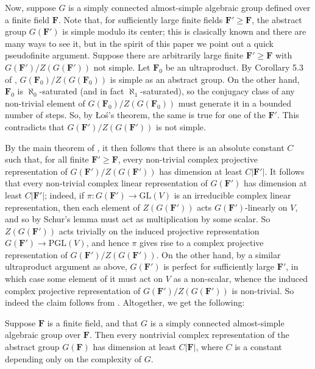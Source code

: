 \documentclass[10pt]{article}
\begin{document}
{Now, suppose $G$ is a simply connected almost-simple algebraic group defined over a finite field $\mathbf{F}$. Note that, for sufficiently large finite fields $\mathbf{F}'\geqslant\mathbf{F}$, the abstract group $G(\mathbf{F}')$ is simple modulo its center; this is clasically known and there are many ways to see it, but in the spirit of this paper we point out a quick pseudofinite argument. Suppose there are arbitrarily large finite $\mathbf{F}'\geqslant\mathbf{F}$ with $G(\mathbf{F}')/Z(G(\mathbf{F}'))$ not simple. Let $\mathbf{F}_0$ be an ultraproduct. By Corollary 5.3 of \cite{hrushovski_pillay_2}, $G(\mathbf{F}_0)/Z(G(\mathbf{F}_0))$ is simple as an abstract group. On the other hand, $\mathbf{F}_0$ is $\aleph_0$-saturated (and in fact $\aleph_1$-saturated), so the conjugacy class of any non-trivial element of $G(\mathbf{F}_0)/Z(G(\mathbf{F}_0))$ must generate it in a bounded number of steps. So, by Łoś's theorem, the same is true for one of the $\mathbf{F}'$. This contradicts that $G(\mathbf{F}')/Z(G(\mathbf{F}'))$ is not simple.

By the main theorem of \cite{landazuri_seitz}, it then follows that there is an absolute constant $C$ such that, for all finite $\mathbf{F}'\geqslant\mathbf{F}$, every non-trivial complex projective representation of $G(\mathbf{F}')/Z(G(\mathbf{F}'))$ has dimension at least $C|\mathbf{F}'|$. It follows that every non-trivial complex linear representation of $G(\mathbf{F}')$ has dimension at least $C|\mathbf{F}'|$; indeed, if $\pi:G(\mathbf{F}')\to\mathrm{GL}(V)$ is an irreducible complex linear representation, then each element of $Z(G(\mathbf{F}'))$ acts $G(\mathbf{F}')$-linearly on $V$, and so by Schur's lemma must act as multiplication by some scalar. So $Z(G(\mathbf{F}'))$ acts trivially on the induced projective representation $G(\mathbf{F}')\to\mathrm{PGL}(V)$, and hence $\pi$ gives rise to a complex projective representation of $G(\mathbf{F}')/Z(G(\mathbf{F}'))$. On the other hand, by a similar ultraproduct argument as above, $G(\mathbf{F}')$ is perfect for sufficiently large $\mathbf{F}'$, in which case some element of it must act on $V$ as a non-scalar, whence the induced complex projective representation of $G(\mathbf{F}')/Z(G(\mathbf{F}'))$ is non-trivial. So indeed the claim follows from \cite{landazuri_seitz}. Altogether, we get the following:


\begin{fact}\label{cfsg}
    Suppose $\mathbf{F}$ is a finite field, and that $G$ is a simply connected almost-simple algebraic group over $\mathbf{F}$. Then every nontrivial complex representation of the abstract group $G(\mathbf{F})$ has dimension at least $C|\mathbf{F}|$, where $C$ is a constant depending only on the complexity of $G$.
\end{fact}

}
\end{document}
